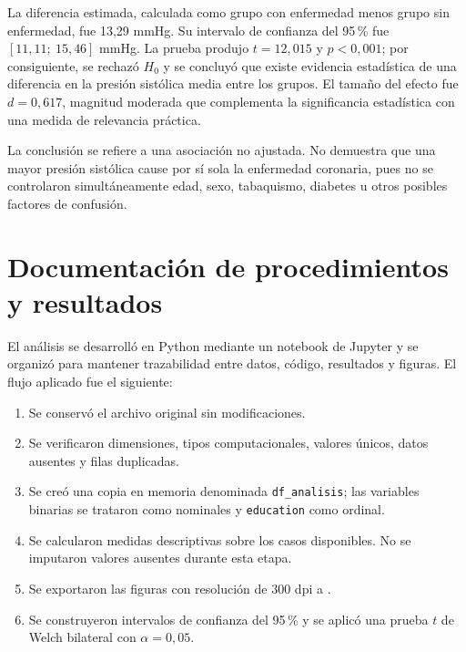 \documentclass[11pt,a4paper]{article}
\begin{document}
La diferencia estimada, calculada como grupo con enfermedad menos grupo sin enfermedad, fue 13,29 mmHg. Su intervalo de confianza del 95\,\% fue $[11,11;\ 15,46]$ mmHg. La prueba produjo $t=12,015$ y $p<0,001$; por consiguiente, se rechazó $H_0$ y se concluyó que existe evidencia estadística de una diferencia en la presión sistólica media entre los grupos. El tamaño del efecto fue $d=0,617$, magnitud moderada que complementa la significancia estadística con una medida de relevancia práctica.

La conclusión se refiere a una asociación no ajustada. No demuestra que una mayor presión sistólica cause por sí sola la enfermedad coronaria, pues no se controlaron simultáneamente edad, sexo, tabaquismo, diabetes u otros posibles factores de confusión.

\section{Documentación de procedimientos y resultados}

El análisis se desarrolló en Python mediante un notebook de Jupyter y se organizó para mantener trazabilidad entre datos, código, resultados y figuras. El flujo aplicado fue el siguiente:

\begin{enumerate}[leftmargin=1.7em,itemsep=0.25em]
  \item Se conservó el archivo original  sin modificaciones.
  \item Se verificaron dimensiones, tipos computacionales, valores únicos, datos ausentes y filas duplicadas.
  \item Se creó una copia en memoria denominada \texttt{df\_analisis}; las variables binarias se trataron como nominales y \texttt{education} como ordinal.
  \item Se calcularon medidas descriptivas sobre los casos disponibles. No se imputaron valores ausentes durante esta etapa.
  \item Se exportaron las figuras con resolución de 300 dpi a .
  \item Se construyeron intervalos de confianza del 95\,\% y se aplicó una prueba $t$ de Welch bilateral con $\alpha=0,05$.
\end{enumerate}
\end{document}
